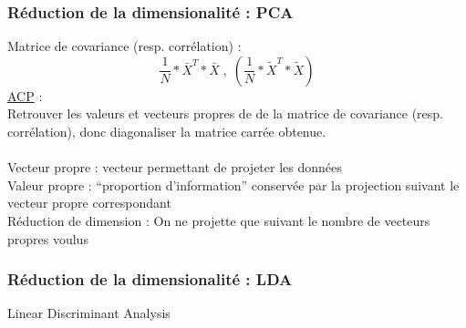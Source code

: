 \begin{frame}
  \frametitle{Réduction de la dimensionalité : PCA}
  Matrice de covariance (resp. corrélation) :
  \[
  \frac{1}{N} * \bar{X}^T * \bar{X} \;,\;( \frac{1}{N} * \tilde{X}^T * \tilde{X} )
  \]
  \underline{ACP} : \\
  Retrouver les valeurs et vecteurs propres de de la matrice de covariance (resp. corrélation), donc diagonaliser la matrice carrée obtenue. \\
  \\
  Vecteur propre : vecteur permettant de projeter les données \\
  Valeur propre : ``proportion d'information'' conservée par la projection suivant le vecteur propre correspondant \\
  Réduction de dimension : On ne projette que suivant le nombre de vecteurs propres voulus
\end{frame}

\begin{frame}
  \frametitle{Réduction de la dimensionalité : LDA}
  \begin{center}
    Linear Discriminant Analysis
  \end{center}
  \begin{minipage}[l]{0.49\linewidth}
  \end{minipage}\hfill
  \begin{minipage}[l]{0.49\linewidth}
  \end{minipage}\hfill
\end{frame}
